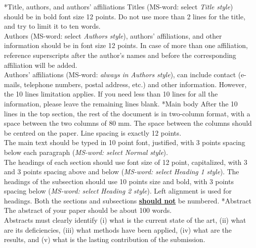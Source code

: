 \documentclass[twocolumn, a4paper,10pt]{article}
\makeatletter
\renewcommand\section{\@startsection{section}{1}{\z@}{3pt}{3pt}{\normalfont\large\bfseries}}
\renewcommand\subsection{\@startsection{subsection}{1}{\z@}{\z@}{\z@}{\normalfont\normalsize\bfseries}}
\renewcommand\subsection{\@startsection{subsection}{1}{\z@}{\z@}{0.1pt}{\normalfont\normalsize\bfseries}}
\makeatother
\begin{document}
\subsection*{Title, authors, and authors' affiliations}
Titles (MS-word: select \textit{Title style}) should be in bold font size 12 points. Do not use more than 2 lines for the title, and try to limit it to ten words.\\
Authors (MS-word: select \textit{Authors style}), authors' affiliations, and other information should be in font size 12 points. In case of more than one affiliation, reference superscripts after the author's names and before the corresponding affiliation will be added.\\
Authors' affiliations (MS-word: \textit{always in Authors style}), can include contact (e-mails, telephone numbers, postal address, etc.) and other information. However, the 10 lines limitation applies. If you need less than 10 lines for all the information, please leave the remaining lines blank.
\section*{Main body}
After the 10 lines in the top section, the rest of the document is in two-column format, with a space between the two columns of 80 mm. The space between the columns should be centred on the paper. Line spacing is exactly 12 points.\\
The main text should be typed in 10 point font, justified, with 3 points spacing below each paragraph (\textit{MS-word: select \textit{Normal style}}).\\
The headings of each section should use font size of 12 point, capitalized, with 3 and 3 points spacing above and below (\textit{MS-word: select \textit{Heading 1 style}}). The headings of the subsection should use 10 points size and bold, with 3 points spacing below (\textit{MS-word: select \textit{Heading 2 style}}). Left alignment is used for headings. Both the sections and subsections \underline{\textbf{should not}} be numbered.
\subsection*{Abstract}
The abstract of your paper should be about 100 words.\\
Abstracts must clearly identify (i) what is the current state of the art, (ii) what are its deficiencies, (iii) what methods have been applied, (iv) what are the results, and (v) what is the lasting contribution of the submission.
\end{document}
